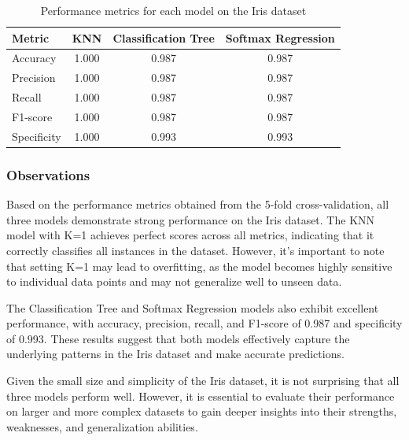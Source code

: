 \documentclass[letterpaper,10pt]{article}
\begin{document}
\begin{table}[ht]
\centering
\caption{Performance metrics for each model on the Iris dataset}
\label{tab:iris_metrics}
\begin{tabular}{|l|c|c|c|}
\hline
\textbf{Metric} & \textbf{KNN} & \textbf{Classification Tree} & \textbf{Softmax Regression} \\ %
\hline
Accuracy & 1.000 & 0.987 & 0.987 \\ %
\hline
Precision & 1.000 & 0.987 & 0.987 \\ %
\hline
Recall & 1.000 & 0.987 & 0.987 \\ %
\hline
F1-score & 1.000 & 0.987 & 0.987 \\ %
\hline
Specificity & 1.000 & 0.993 & 0.993 \\ %
\hline
\end{tabular}
\end{table}

\subsubsection{Observations}

Based on the performance metrics obtained from the 5-fold cross-validation, all three models demonstrate strong performance on the Iris dataset. The KNN model with K=1 achieves perfect scores across all metrics, indicating that it correctly classifies all instances in the dataset. However, it's important to note that setting K=1 may lead to overfitting, as the model becomes highly sensitive to individual data points and may not generalize well to unseen data. \par

The Classification Tree and Softmax Regression models also exhibit excellent performance, with accuracy, precision, recall, and F1-score of 0.987 and specificity of 0.993. These results suggest that both models effectively capture the underlying patterns in the Iris dataset and make accurate predictions. \par

Given the small size and simplicity of the Iris dataset, it is not surprising that all three models perform well. However, it is essential to evaluate their performance on larger and more complex datasets to gain deeper insights into their strengths, weaknesses, and generalization abilities. \par
\end{document}
